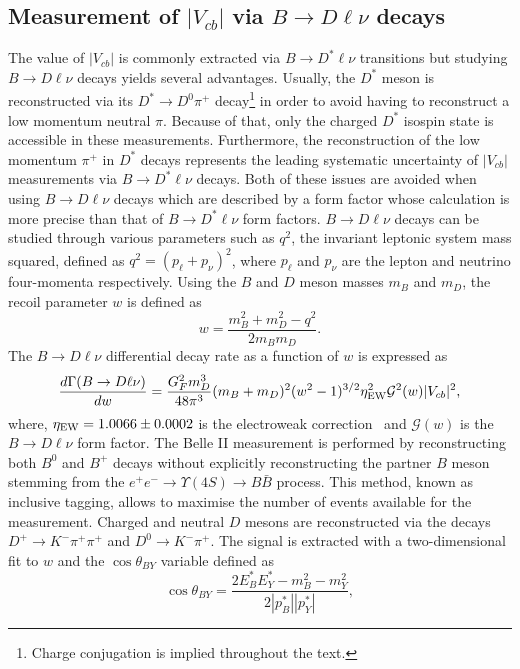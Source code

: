 \documentclass{moriond}
\def\vcb{V_{cb}}
\def\btodlnu{B \to D\ell\nu}
\def\btodstlnu{B \to D^*\ell\nu}
\def\costby{\cos\theta_{BY}}
\begin{document}
\subsection{Measurement of $|\vcb|$ via $\btodlnu$ decays}
The value of $|\vcb|$ is commonly extracted via $\btodstlnu$ transitions but studying $\btodlnu$ decays yields several advantages. Usually, the $D^*$ meson is reconstructed via its $D^* \to D^0 \pi^+$ decay\footnote{Charge conjugation is implied throughout the text.} in order to avoid having to reconstruct a low momentum neutral $\pi$. Because of that, only the charged $D^*$ isospin state is accessible in these measurements. Furthermore, the reconstruction of the low momentum $\pi^+$ in $D^*$ decays represents the leading systematic uncertainty of $|\vcb|$ measurements via $\btodstlnu$ decays. Both of these issues are avoided when using $\btodlnu$ decays which are described by a form factor whose calculation is more precise than that of $\btodstlnu$ form factors. $\btodlnu$ decays can be studied through various parameters such as $q^2$, the invariant leptonic system mass squared, defined as $q^2 = (p_\ell + p_\nu)^2$, where $p_\ell$ and $p_\nu$ are the lepton and neutrino four-momenta respectively. Using the $B$ and $D$ meson masses $m_B$ and $m_D$, the recoil parameter $w$ is defined as
\begin{equation}
    w = \frac{m_B^2 + m_D^2 - q^2}{2m_Bm_D}.
\end{equation}
The $\btodlnu$ differential decay rate as a function of $w$ is expressed as~\cite{hqs}
\begin{equation}
    \frac{d\Gamma(\btodlnu)}{dw} = \frac{G_F^2m_D^3}{48\pi^3} (m_B+m_D)^2(w^2-1)^{3/2}\eta_{\rm EW}^2\mathcal{G}^2(w)|\vcb|^2,
\end{equation}
where, $\eta_{\rm EW} = 1.0066 \pm 0.0002$ is the electroweak correction~\cite{etaew} and $\mathcal{G}(w)$ is the $\btodlnu$ form factor. The Belle II measurement is performed by reconstructing both $B^0$ and $B^+$ decays without explicitly reconstructing the partner $B$ meson stemming from the $e^+e^- \to \Upsilon(4S) \to B\bar{B}$ process. This method, known as inclusive tagging, allows to maximise the number of events available for the measurement. Charged and neutral $D$ mesons are reconstructed via the decays $D^+ \to K^- \pi^+ \pi^+$ and $D^0 \to K^- \pi^+$. The signal is extracted with a two-dimensional fit to $w$ and the $\costby$ variable defined as
\begin{equation}\label{equ:costby}
    \costby = \frac{2E^*_BE^*_Y-m_B^2-m_Y^2}{2|p_B^*||p_Y^*|},
\end{equation}
\end{document}
